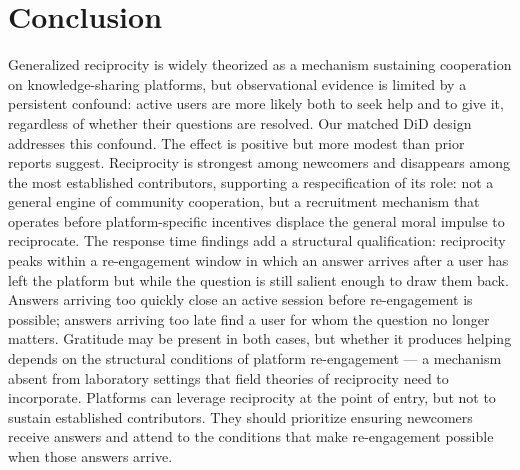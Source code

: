 \section{Conclusion} \label{sec:conclusion} %
Generalized reciprocity is widely theorized as a mechanism sustaining cooperation on knowledge-sharing platforms, but observational evidence is limited by a persistent confound: active users are more likely both to seek help and to give it, regardless of whether their questions are resolved. Our matched DiD design addresses this confound. The effect is positive but more modest than prior reports suggest. Reciprocity is strongest among newcomers and disappears among the most established contributors, supporting a respecification of its role: not a general engine of community cooperation, but a recruitment mechanism that operates before platform-specific incentives displace the general moral impulse to reciprocate. The response time findings add a structural qualification: reciprocity peaks within a re-engagement window in which an answer arrives after a user has left the platform but while the question is still salient enough to draw them back. Answers arriving too quickly close an active session before re-engagement is possible; answers arriving too late find a user for whom the question no longer matters. Gratitude may be present in both cases, but whether it produces helping depends on the structural conditions of platform re-engagement --- a mechanism absent from laboratory settings that field theories of reciprocity need to incorporate. Platforms can leverage reciprocity at the point of entry, but not to sustain established contributors. They should prioritize ensuring newcomers receive answers and attend to the conditions that make re-engagement possible when those answers arrive.